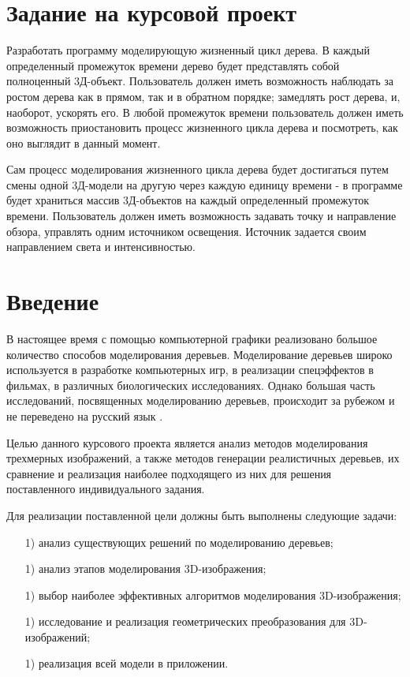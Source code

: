 \documentclass[54pt, a4paper]{article}
\begin{document}
 	\section*{Задание на курсовой проект}
	\Large Разработать программу моделирующую жизненный цикл дерева. В каждый определенный промежуток времени дерево будет представлять собой полноценный 3Д-объект. Пользователь должен иметь возможность наблюдать за ростом дерева как в прямом, так и в обратном порядке; замедлять рост дерева, и, наоборот, ускорять его. В любой промежуток времени пользователь должен иметь возможность приостановить процесс жизненного цикла дерева и посмотреть, как оно выглядит в данный момент.
	
	Сам процесс моделирования жизненного цикла дерева будет достигаться путем смены одной 3Д-модели на другую через каждую единицу времени - в программе будет храниться массив 3Д-объектов на каждый определенный промежуток времени. Пользователь должен иметь возможность задавать точку и направление обзора, управлять одним источником освещения. Источник задается своим направлением света и интенсивностью.
	\newpage
	
	\tableofcontents
	\newpage
	\section*{Введение}
	В настоящее время с помощью компьютерной графики реализовано большое количество способов моделирования деревьев. Моделирование деревьев широко используется в разработке компьютерных игр, в реализации спецэффектов в фильмах, в различных биологических исследованиях. Однако большая часть исследований, посвященных моделированию деревьев, происходит за рубежом и не переведено на русский язык \cite{tree_book}.
	
	Целью данного курсового проекта является анализ методов моделирования трехмерных изображений, а также методов генерации реалистичных деревьев, их сравнение и реализация наиболее подходящего из них для решения поставленного индивидуального задания.
	
	Для реализации поставленной цели должны быть выполнены следующие задачи:
	\begin{enumerate}
		\item[1)] анализ существующих решений по моделированию деревьев;
		\item[1)] анализ этапов моделирования 3D-изображения;
		\item[1)] выбор наиболее эффективных алгоритмов моделирования 3D-изображения;
		\item[1)] исследование и реализация геометрических преобразования для 3D-изображений;
		\item[1)] реализация всей модели в приложении.
	\end{enumerate}
\end{document}
